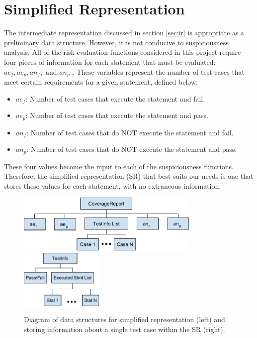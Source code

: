 \section{Simplified Representation} \label{sec:sir}

The intermediate representation discussed in section \ref{sec:ir} is appropriate as a preliminary
data structure.  However, it is not conducive to suspiciousness analysis.  All of the risk evaluation
functions considered in this project require four pieces of information for each statement that
must be evaluated: $ae_f, ae_p, an_f, \text{ and } an_p$ \cite{theory}.  These variables represent the number
of test cases that meet certain requirements for a given statement, defined below:

\begin{itemize}
\item $ae_f$:  Number of test cases that execute the statement and fail.
\item $ae_p$:  Number of test cases that execute the statement and pass.
\item $an_f$:  Number of test cases that do NOT execute the statement and fail.
\item $an_p$:  Number of test cases that do NOT execute the statement and pass.
\end{itemize}

These four values become the input to each of
the suspiciousness functions.  Therefore, the simplified representation (SR) that best suits our needs
is one that stores these values for each statement, with no extraneous information.

\begin{figure}[tb]
\centering
\includegraphics[height=28mm]{img/CoverageReport.pdf}
\hspace{0.1\linewidth}
\includegraphics[height=28mm]{img/TestInfo.pdf}
\caption{Diagram of data structures for simplified representation (left) and  storing information
about a single test case within the SR (right).}
\label{fig:sr}
\end{figure}

